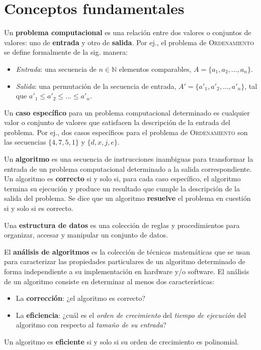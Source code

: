 \chapter{Conceptos fundamentales}

Un \textbf{problema computacional} es una relación entre dos valores o conjuntos de valores: uno de \textbf{entrada} y otro de \textbf{salida}. 
Por ej., el problema de \textsc{Ordenamiento} se define formalmente de la sig. manera:
\begin{itemize}
  \item \emph{Entrada}: una secuencia de \(n\in\mathbb{N}\) elementos comparables, \(A=\{a_1,a_2,\dots,a_n\}\).
  \item \emph{Salida}: una permutación de la secuencia de entrada, \(A'=\{a'_1,a'_2,\dots,a'_n\}\), tal que \(a'_1\leq a'_2\leq\dots\leq a'_n\).
\end{itemize}

Un \textbf{caso específico} para un problema computacional determinado es cualquier valor o conjunto de valores que satisfacen la descripción de la entrada del problema.
Por ej., dos casos específicos para el problema de \textsc{Ordenamiento} son las secuencias \(\{4,7,5,1\}\) y \(\{d,x,j,e\}\).

Un \textbf{algoritmo} es una secuencia de instrucciones inambiguas para transformar la entrada de un problema computacional determinado a la salida correspondiente.
Un algoritmo es \textbf{correcto} si y solo si, para cada caso específico, el algoritmo termina su ejecución y produce un resultado que cumple la descripción de la salida del problema.
Se dice que un algoritmo \textbf{resuelve} el problema en cuestión si y solo si es correcto.

Una \textbf{estructura de datos} es una colección de reglas y procedimientos para organizar, accesar y manipular un conjunto de datos.

El \textbf{análisis de algoritmos} es la colección de técnicas matemáticas que se usan para caracterizar las propiedades particulares de un algoritmo determinado de forma independiente a su implementación en hardware y/o software. 
El análisis de un algoritmo consiste en determinar al menos dos características:
\begin{itemize}
  \item La \textbf{corrección}: ¿el algoritmo es correcto?
  \item La \textbf{eficiencia}: ¿cuál es el \emph{orden de crecimiento} del 
  \emph{tiempo de ejecución} del algoritmo con respecto al \emph{tamaño de su entrada}?
\end{itemize}
Un algoritmo es \textbf{eficiente} si y solo si su orden de crecimiento es polinomial.


